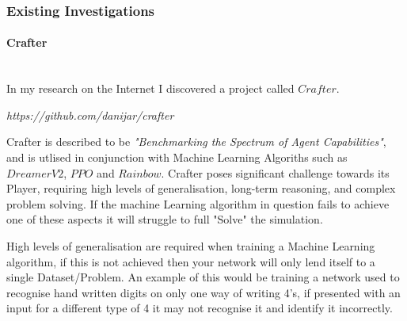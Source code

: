 \begin{flushleft}
\begin{enumerate}
                    \vspace{0.5cm}
                \end{enumerate}
                \subsubsection{Existing Investigations} 
                    \paragraph{Crafter} \mbox{} \\
                        \vspace{0.2cm}
                            In my research on the Internet I discovered a project called $Crafter$. \\

                            \vspace{0.2cm}
                            \centerline{\textit{https://github.com/danijar/crafter}}
                            \vspace{0.2cm}

                            Crafter is described to be \textit{"Benchmarking the Spectrum of Agent Capabilities"}, and is utlised
                            in conjunction with Machine Learning Algoriths such as $DreamerV2$, $PPO$ and $Rainbow$. Crafter poses significant
                            challenge towards its Player, requiring high levels of generalisation, long-term reasoning, and complex 
                            problem solving. If the machine Learning algorithm in question fails to achieve one of these aspects it will 
                            struggle to full "Solve" the simulation. \\

                            \vspace{0.2cm}

                            High levels of generalisation are required when training a Machine Learning algorithm, if this is not achieved then
                            your network will only lend itself to a single Dataset/Problem. An example of this would be training a network used
                            to recognise hand written digits on only one way of writing 4's, if presented with an input for a different type of 
                            4 it may not recognise it and identify it incorrectly. \\
                            

\end{flushleft}
